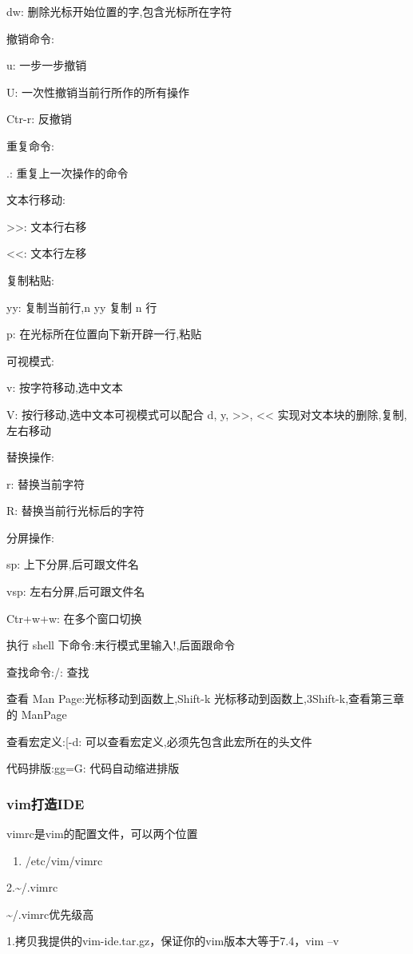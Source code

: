 \documentclass[11pt]{article}
\begin{document}
dw: 删除光标开始位置的字,包含光标所在字符

撤销命令:

u: 一步一步撤销 

U: 一次性撤销当前行所作的所有操作 

Ctr-r: 反撤销

重复命令:

.: 重复上一次操作的命令

文本行移动:

>>: 文本行右移 

<<: 文本行左移

复制粘贴:

yy: 复制当前行,n yy 复制 n 行 

p: 在光标所在位置向下新开辟一行,粘贴

可视模式:

v: 按字符移动,选中文本 

V: 按行移动,选中文本可视模式可以配合 d, y, >>, << 实现对文本块的删除,复制,左右移动

替换操作:

r: 替换当前字符 

R: 替换当前行光标后的字符

分屏操作:

sp: 上下分屏,后可跟文件名 

vsp: 左右分屏,后可跟文件名

Ctr+w+w: 在多个窗口切换

执行 shell 下命令:末行模式里输入!,后面跟命令

查找命令:/: 查找

查看 Man Page:光标移动到函数上,Shift-k 光标移动到函数上,3Shift-k,查看第三章的 ManPage

查看宏定义:[-d: 可以查看宏定义,必须先包含此宏所在的头文件

代码排版:gg=G: 代码自动缩进排版

\subsubsection{vim打造IDE}
\label{sec-1-2-4}
vimrc是vim的配置文件，可以两个位置

\begin{enumerate}
\item /etc/vim/vimrc
\end{enumerate}

2.\textasciitilde{}/.vimrc

\textasciitilde{}/.vimrc优先级高

1.拷贝我提供的vim-ide.tar.gz，保证你的vim版本大等于7.4，vim --v
\end{document}
